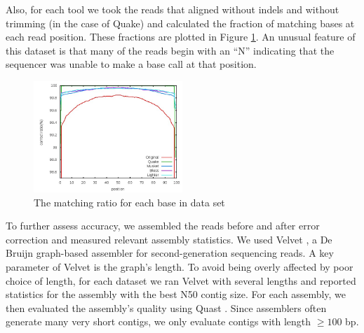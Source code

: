 \documentclass[10pt]{article}
\begin{document}

Also, for each tool we took the reads that aligned without indels and without trimming (in the case of Quake) and calculated the fraction of matching bases at each read position.  These fractions are plotted in Figure \ref{fig:ecoli_perbase}.  An unusual feature of this dataset is that many of the reads begin with an ``N'' indicating that the sequencer was unable to make a base call at that position.


\begin{figure}[h!]
\begin{center}
\includegraphics[width=0.5\textwidth]{per_base.jpg}
\caption{The matching ratio for each base in \ecoli data set\label{fig:ecoli_perbase}}
\end{center}
\end{figure}

To further assess accuracy, we assembled the reads before and after error correction and measured relevant assembly statistics.  We used Velvet \cite{zerbino2008velvet}, a De Bruijn graph-based assembler for second-generation sequencing reads.  A key parameter of Velvet is the graph's \kmer length.  To avoid being overly affected by poor choice of \kmer length, for each dataset we ran Velvet with several \kmer lengths and reported statistics for the assembly with the best N50 contig size.  For each assembly, we then evaluated the assembly's quality using Quast \cite{gurevich2013quast}. Since assemblers often generate many very short contigs, we only evaluate contigs with length $\geq 100$ bp.
\end{document}
